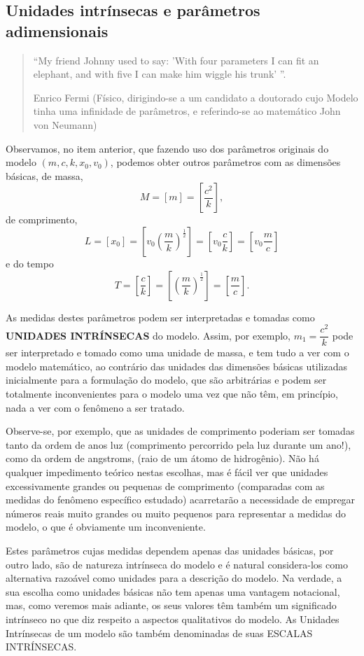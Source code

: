 \subsection{Unidades intrínsecas e parâmetros adimensionais}

\begin{quote}
    ``My friend Johnny used to say: ’With four parameters I can fit an elephant, and with five I can make him wiggle his trunk’ ''.
    
    Enrico Fermi (Físico, dirigindo-se a um candidato a doutorado cujo Modelo tinha uma infinidade de parâmetros, e referindo-se ao matemático John von Neumann)
\end{quote}

    Observamos, no item anterior, que fazendo uso dos parâmetros originais do modelo \((m, c, k, x_0, v_0)\), podemos obter outros parâmetros com as dimensões básicas, de massa,
    \[M = [m] = \left[\dfrac{c^{2}}{k}\right],\]
    de comprimento,
    \[
    L
    = [x_{0}]
    = \left[v_{0} \left(\dfrac{m}{k}\right)^{\frac{1}{2}}\right]
    = \left[v_{0} \dfrac{c}{k}\right]
    = \left[v_{0} \dfrac{m}{c}\right]\]
    e do tempo 
    \[T
    = \left[\dfrac{c}{k}\right]
    = \left[\left(\dfrac{m}{k}\right)^{\frac{1}{2}}\right]
    = \left[\dfrac{m}{c}\right].\]

    As medidas destes parâmetros podem ser interpretadas e tomadas como \textbf{UNIDADES INTRÍNSECAS} do modelo. Assim, por exemplo, \(m_{1} = \dfrac{c^{2}}{k}\) pode ser interpretado e tomado como uma unidade de massa, e tem tudo a ver com o modelo matemático, ao contrário das unidades das dimensões básicas utilizadas inicialmente para a formulação do modelo, que são arbitrárias e podem ser totalmente inconvenientes para o modelo uma vez que não têm, em princípio, nada a ver com o fenômeno a ser tratado.

    Observe-se, por exemplo, que as unidades de comprimento poderiam ser tomadas tanto da ordem de anos luz (comprimento percorrido pela luz durante um ano!), como da ordem de angstroms, (raio de um átomo de hidrogênio). Não há qualquer impedimento teórico nestas escolhas, mas é fácil ver que unidades excessivamente grandes ou pequenas de comprimento (comparadas com as medidas do fenômeno específico estudado) acarretarão a necessidade de empregar números reais muito grandes ou muito pequenos para representar a medidas do modelo, o que é obviamente um inconveniente.

    Estes parâmetros cujas medidas dependem apenas das unidades básicas, por outro lado, são de natureza intrínseca do modelo e é natural considera-los como alternativa razoável como unidades para a descrição do modelo. Na verdade, a sua escolha como unidades básicas não tem apenas uma vantagem notacional, mas, como veremos mais adiante, os seus valores têm também um significado intrínseco no que diz respeito a aspectos qualitativos do modelo. As Unidades Intrínsecas de um modelo são também denominadas de suas ESCALAS INTRÍNSECAS.

